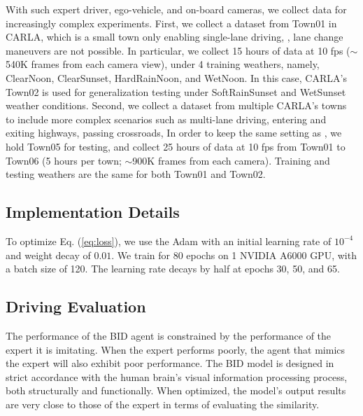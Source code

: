 With such expert driver, ego-vehicle, and on-board cameras, we collect data for increasingly complex experiments. 
First, we collect a dataset from Town01 in CARLA, which is a small town only enabling single-lane driving, {\ie}, lane change maneuvers are not possible. 
In particular, we collect 15 hours of data at 10 fps ($\sim$540K frames from each camera view), under 4 training weathers, namely, ClearNoon, ClearSunset, HardRainNoon, and WetNoon. 
In this case, CARLA's Town02 is used for generalization testing under SoftRainSunset and WetSunset weather conditions. 
Second, we collect a dataset from multiple CARLA's towns to include more complex scenarios such as multi-lane driving, entering and exiting highways, passing crossroads, {\etc} In order to keep the same setting as \cite{Hu:2022}, we hold Town05 for testing, and collect 25 hours of data at 10 fps from Town01 to Town06 (5 hours per town; $\sim$900K frames from each camera). 
Training and testing weathers are the same for both Town01 and Town02. 



\subsection{Implementation Details}
\hspace{1pc}To optimize Eq. (\ref{eq:loss}), we use the Adam \cite{Kingma:2015} with an initial learning rate of $10^{-4}$ and weight decay of $0.01$. 
We train for 80 epochs on 1 NVIDIA A6000 GPU, with a batch size of 120. 
The learning rate decays by half at epochs 30, 50, and 65. 



\subsection{Driving Evaluation}
\label{sec:Metrics}
The performance of the BID agent is constrained by the performance of the expert it is imitating. 
When the expert performs poorly, the agent that mimics the expert will also exhibit poor performance. 
The BID model is designed in strict accordance with the human brain's visual information processing process, both structurally and functionally. 
When optimized, the model's output results are very close to those of the expert in terms of evaluating the similarity.


